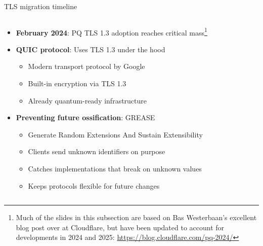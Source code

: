 \documentclass[aspectratio=169, lualatex, handout]{beamer}
\begin{document}
\begin{frame}{TLS migration timeline}
	\begin{columns}[c]
		\begin{column}{1\textwidth}
			\begin{itemize}
				\item \textbf{February 2024}: PQ TLS 1.3 adoption reaches critical mass\footnote{Much of the slides in this subsection are based on Bas Westerbaan's excellent blog post over at Cloudflare, but have been updated to account for developments in 2024 and 2025: \url{https://blog.cloudflare.com/pq-2024/}}
				\item \textbf{QUIC protocol}: Uses TLS 1.3 under the hood
				      \begin{itemize}
					      \item Modern transport protocol by Google
					      \item Built-in encryption via TLS 1.3
					      \item Already quantum-ready infrastructure
				      \end{itemize}
				\item \textbf{Preventing future ossification}: GREASE
				      \begin{itemize}
					      \item Generate Random Extensions And Sustain Extensibility
					      \item Clients send unknown identifiers on purpose
					      \item Catches implementations that break on unknown values
					      \item Keeps protocols flexible for future changes
				      \end{itemize}
			\end{itemize}
		\end{column}
	\end{columns}
\end{frame}
\end{document}
